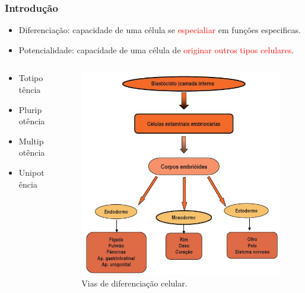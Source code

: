 \documentclass[brazil]{beamer}
\begin{document}
  \begin{frame}
  \frametitle{Introdução}
    \raggedright  
    \begin{itemize}
     \item Diferenciação: capacidade de uma célula se \textcolor{red}{especialiar} em funções especificas.
     \item Potencialidade: capacidade de uma célula de \textcolor{red}{originar outros tipos celulares}.
    \end{itemize}
    \begin{columns}[T]
      \begin{column}{0.3\textwidth}
	\begin{itemize}
	  \item Totipotência
	  \item Pluripotência 
	  \item Multipotência
	  \item Unipotência
	\end{itemize}
      \end{column}
      \hfill%
      \begin{column}{0.6\textwidth}
	\begin{figure}
	  \includegraphics[scale=0.28]{folhetos_embrionarios_2.jpg}
	  \caption{\tiny Vias de diferenciação celular.}
	\end{figure}  
      \end{column}%
    \end{columns}
  
 \end{frame}
  
\end{document}
